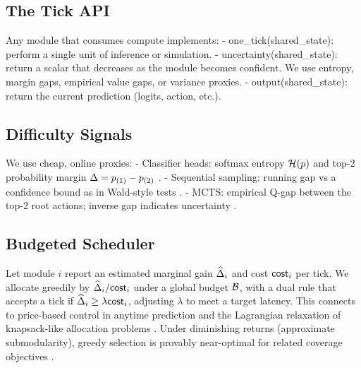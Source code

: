 \subsection{The Tick API}
Any module that consumes compute implements:
- one\_tick(shared\_state): perform a single unit of inference or simulation.
- uncertainty(shared\_state): return a scalar that decreases as the module becomes confident. We use entropy, margin gaps, empirical value gaps, or variance proxies.
- output(shared\_state): return the current prediction (logits, action, etc.).

\subsection{Difficulty Signals}
We use cheap, online proxies:
- Classifier heads: softmax entropy $\mathcal{H}(p)$ and top-2 probability margin $\Delta = p_{(1)}-p_{(2)}$ \cite{Kaya2019ShallowDeep,Guo2017Calibration}.
- Sequential sampling: running gap vs a confidence bound as in Wald-style tests \cite{Wald1945Sequential}.
- MCTS: empirical Q-gap between the top-2 root actions; inverse gap indicates uncertainty \cite{Kocsis2006UCT,Coulom2006MCTS}.

\subsection{Budgeted Scheduler}
Let module $i$ report an estimated marginal gain $\widehat{\Delta}_i$ and cost $\mathsf{cost}_i$ per tick. We allocate greedily by $\widehat{\Delta}_i/\mathsf{cost}_i$ under a global budget $\mathcal{B}$, with a dual rule that accepts a tick if $\widehat{\Delta}_i \ge \lambda \mathsf{cost}_i$, adjusting $\lambda$ to meet a target latency. This connects to price-based control in anytime prediction \cite{Graves2016ACT,Anthony2017ThinkingFast} and the Lagrangian relaxation of knapsack-like allocation problems \cite{BoydVandenberghe2004}. Under diminishing returns (approximate submodularity), greedy selection is provably near-optimal for related coverage objectives \cite{Nemhauser1978}.

